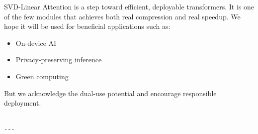 SVD-Linear Attention is a step toward efficient, deployable transformers. 
It is one of the few modules that achieves both real compression and real 
speedup. We hope it will be used for beneficial applications such as:

\begin{itemize}
\item On-device AI
\item Privacy-preserving inference
\item Green computing

\end{itemize}
But we acknowledge the dual-use potential and encourage responsible 
deployment.
\begin{lstlisting}

---
\end{lstlisting}

